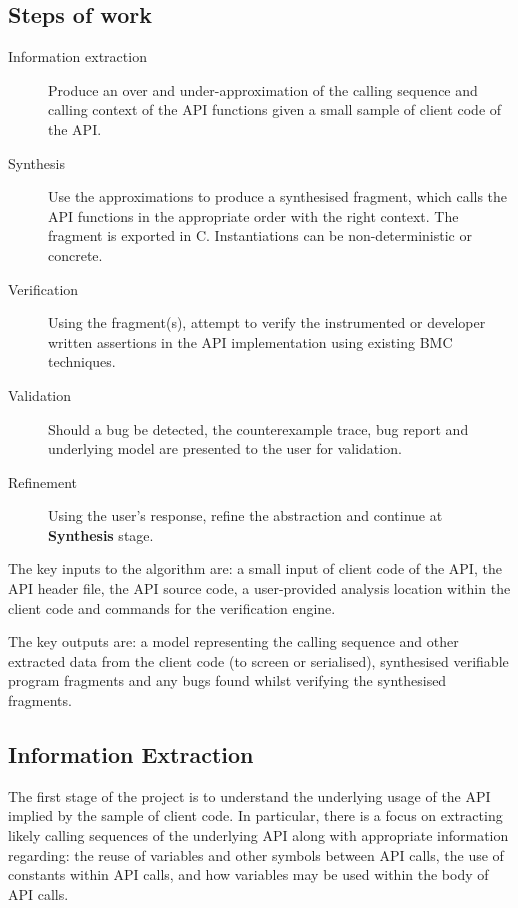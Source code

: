 \documentclass[EPiC]{easychair}
\begin{document}
\subsection{Steps of work}
\label{sec:steps}
\begin{description}
	\item[Information extraction]  Produce an over and under-approximation of the calling sequence and calling context of the API functions given a  small sample of client code of the API.
	\item[Synthesis] Use the approximations to produce a synthesised fragment, which calls the API functions in the appropriate order with the right context.  The fragment is exported in C.  Instantiations can be non-deterministic or concrete.
	\item[Verification] Using the fragment(s), attempt to verify the instrumented or developer written assertions in the API implementation using existing BMC techniques.
	\item[Validation]  Should a bug be detected, the counterexample trace, bug report and underlying model are presented to the user for validation.
	\item[Refinement] Using the user's response, refine the abstraction and continue at \textbf{Synthesis} stage.
\end{description}

The key inputs to the algorithm are:  a small input of client code of the API, the API header file, the API source code, a user-provided analysis location within the client code and commands for the verification engine.

The key outputs are: a model representing the calling sequence and other extracted data from the client code (to screen or serialised),  synthesised verifiable program fragments and any bugs found whilst verifying the synthesised fragments.


\subsection{Information Extraction}
\label{sec:information_extraction}
The first stage of the project is to understand the underlying usage of the API implied by the sample of client code.  In particular, there is a focus on extracting likely calling sequences of the underlying API along with appropriate information regarding: the reuse of variables and other symbols between API calls, the use of constants within API calls, and how variables may be used within the body of API calls.
\end{document}
